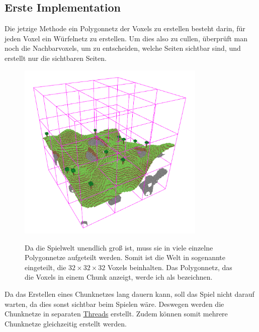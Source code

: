 \subsection{Erste Implementation}

Die jetzige Methode ein Polygonnetz der Voxels
zu erstellen besteht darin, für jeden Voxel
ein Würfelnetz zu erstellen.
Um dies also zu cullen, überprüft man
noch die Nachbarvoxels, um zu entscheiden,
welche Seiten sichtbar sind, und erstellt nur
die sichtbaren Seiten.


\begin{figure}[ht]
	\begin{minipage}[c]{0.49\textwidth}
		\begin{center}
\includegraphics[width=0.8\textwidth]{../assets/culling/chunk_borders.png}
		\end{center}
	\end{minipage}
	\begin{minipage}[c]{0.49\textwidth}
Da die Spielwelt unendlich groß ist, muss sie
in viele einzelne Polygonnetze aufgeteilt werden.
Somit ist die Welt in sogenannte 
eingeteilt, die $32 \times 32 \times 32$ Voxels
beinhalten. Das Polygonnetz, das die Voxels in einem
Chunk anzeigt, werde ich als
 bezeichnen.
	\end{minipage}\hfill
\end{figure}

Da das Erstellen eines Chunknetzes lang dauern kann,
soll das Spiel nicht darauf warten,
da dies sonst sichtbar beim Spielen wäre.
Deswegen werden die Chunknetze in separaten
\href{https://de.wikipedia.org/wiki/Thread_(Informatik)}{Threads}
erstellt.
Zudem können somit mehrere Chunknetze gleichzeitig
erstellt werden.

